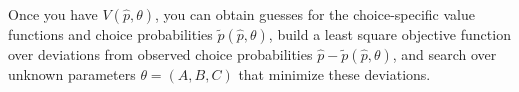 \documentclass{article}
\begin{document}
\begin{enumerate}
    Once you have $V(\hat{p}, \theta)$, you can obtain guesses for the choice-specific value functions and choice probabilities $\tilde{p}(\hat{p}, \theta)$, build a least square objective function over deviations from observed choice probabilities $\hat{p} - \tilde{p}(\hat{p}, \theta)$, and search over unknown parameters $\theta = (A,B,C)$ that minimize these deviations.

\begin{answer}
\end{answer}
    
\end{enumerate}
\end{document}
